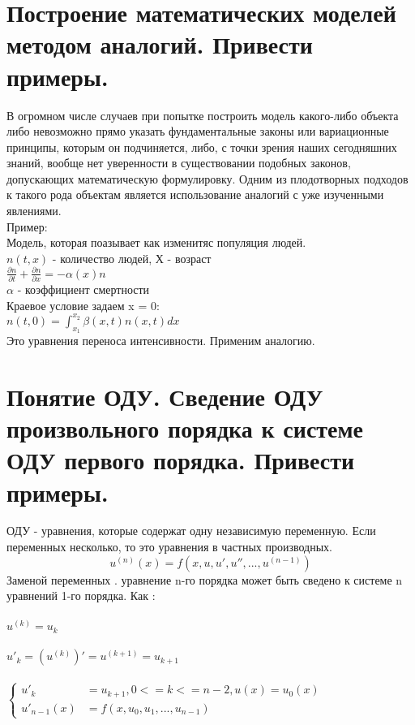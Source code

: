 \documentclass[12pt,a4paper]{article}
\begin{document}
	\section{Построение математических моделей методом аналогий. Привести примеры.}
	В огромном числе случаев при попытке построить модель какого-либо объекта либо невозможно прямо указать фундаментальные законы или вариационные принципы, которым он подчиняется, либо, с точки зрения наших сегодняшних знаний, вообще нет уверенности в существовании подобных законов, допускающих математическую формулировку. Одним из плодотворных подходов к такого рода объектам является использование аналогий с уже изученными явлениями.\\
	Пример:\\
	Модель, которая поазывает как изменитяс популяция людей.\\
	$n(t, x)$ - количество людей, Х - возраст\\
	$\displaystyle\frac{\partial n}{\partial t} + \displaystyle\frac{\partial n}{\partial x} = - \alpha(x) n$\\
	$\alpha$ - коэффициент смертности\\
	Краевое условие задаем x = 0:\\
	$n(t, 0) = \displaystyle\int_{x_1}^{x_2}\beta(x, t) n(x, t) dx$\\
	Это уравнения переноса интенсивности. Применим аналогию. 
	\section{Понятие ОДУ. Сведение ОДУ произвольного порядка к системе ОДУ первого порядка. Привести примеры.}
	ОДУ - уравнения, которые содержат одну независимую переменную. Если переменных несколько, то это уравнения в частных производных. \\
	\begin{equation*}
	u^{(n)}(x) = f(x, u, u' ,u'', ..., u^{(n-1)})
	\end{equation*}
	Заменой переменных . уравнение n-го порядка может быть сведено к системе n уравнений 1-го порядка. Как :\\\\
	$u^{(k)} = u_k$\\\\
	$u'_k = (u^{(k)})' = u^{(k+1)} = u_{k+1}$\\\\
	$\begin{cases}
	u'_k &= u_{k+1}, 0 <= k <= n-2, u(x) = u_0(x)\\
	u'_{n-1}(x) &= f(x, u_0, u_1, ..., u_{n-1}) 
	\end{cases}$\\\\
\end{document}
